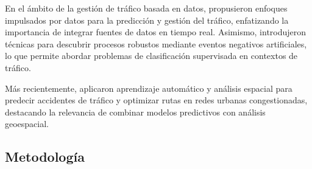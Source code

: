 \documentclass[12pt]{article}
\begin{document}
En el ámbito de la gestión de tráfico basada en datos, \textcite{chen2015} propusieron enfoques impulsados por datos para la predicción y gestión del tráfico, enfatizando la importancia de integrar fuentes de datos en tiempo real. Asimismo, \textcite{goedertier2009robust} introdujeron técnicas para descubrir procesos robustos mediante eventos negativos artificiales, lo que permite abordar problemas de clasificación supervisada en contextos de tráfico.

Más recientemente, \textcite{berhanu2024} aplicaron aprendizaje automático y análisis espacial para predecir accidentes de tráfico y optimizar rutas en redes urbanas congestionadas, destacando la relevancia de combinar modelos predictivos con análisis geoespacial.

\subsection{Metodología}
\end{document}
